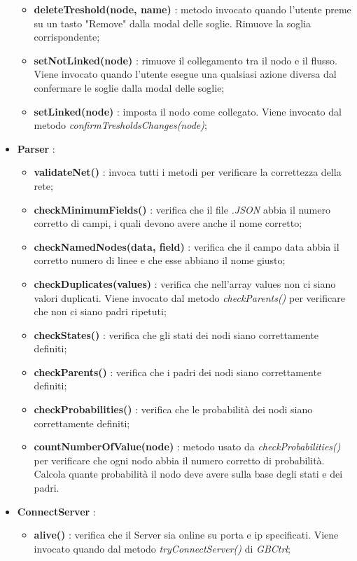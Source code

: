 \begin{itemize}
\begin{itemize}
				\item \textbf{deleteTreshold(node, name)} : metodo invocato quando l'utente preme su un tasto "Remove" dalla modal delle soglie. Rimuove la soglia corrispondente;
				\item \textbf{setNotLinked(node)} : rimuove il collegamento tra il nodo e il flusso. Viene invocato quando l'utente esegue una qualsiasi azione diversa dal confermare le soglie dalla modal delle soglie;
				\item \textbf{setLinked(node)} : imposta il nodo come collegato. Viene invocato dal metodo \textit{confirmTresholdsChanges(node)};
			\end{itemize}
			\item \textbf{Parser} :
			\begin{itemize}
				\item \textbf{validateNet()} : invoca tutti i metodi per verificare la correttezza della rete;
				\item \textbf{checkMinimumFields()} : verifica che il file \textit{.JSON} abbia il numero corretto di campi, i quali devono avere anche il nome corretto;
				\item \textbf{checkNamedNodes(data, field)} : verifica che il campo data abbia il corretto numero di linee e che esse abbiano il nome giusto;
				\item \textbf{checkDuplicates(values)} : verifica che nell'array values non ci siano valori duplicati. Viene invocato dal metodo \textit{checkParents()} per verificare che non ci siano padri ripetuti;
				\item \textbf{checkStates()} : verifica che gli stati dei nodi siano correttamente definiti;
				\item \textbf{checkParents()} : verifica che i padri dei nodi siano correttamente definiti;
				\item \textbf{checkProbabilities()} : verifica che le probabilità dei nodi siano correttamente definiti;
				\item \textbf{countNumberOfValue(node)} : metodo usato da \textit{checkProbabilities()} per verificare che ogni nodo abbia il numero corretto di probabilità. Calcola quante probabilità il nodo deve avere sulla base degli stati e dei padri.
			\end{itemize}
			\item \textbf{ConnectServer} :
			\begin{itemize}
				\item \textbf{alive()} : verifica che il Server sia online su porta e ip specificati. Viene invocato quando dal metodo \textit{tryConnectServer()} di \textit{GBCtrl};

\end{itemize}
\end{itemize}
